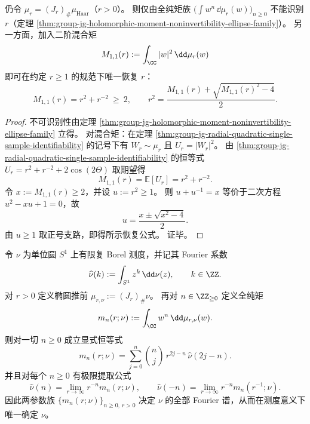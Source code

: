 \begin{proposition}\label{prop:group-jg-minimal-radial-identifiability-threshold}
仍令 \(\mu_r=(J_r)_\#\mu_{\mathrm{Haar}}\)（\(r>0\)）。
则仅由全纯矩族 \(\bigl(\int w^n\,\dd\mu_r(w)\bigr)_{n\ge 0}\) 不能识别 \(r\)（定理 \ref{thm:group-jg-holomorphic-moment-noninvertibility-ellipse-family}）。
另一方面，加入二阶混合矩
\[
M_{1,1}(r):=\int_{\CC}|w|^2\,\dd\mu_r(w)
\]
即可在约定 \(r\ge 1\) 的规范下唯一恢复 \(r\)：
\[
M_{1,1}(r)=r^2+r^{-2}\ \ge\ 2,
\qquad
r^2=\frac{M_{1,1}(r)+\sqrt{M_{1,1}(r)^2-4}}{2}.
\]
\end{proposition}

\begin{proof}
不可识别性由定理 \ref{thm:group-jg-holomorphic-moment-noninvertibility-ellipse-family} 立得。
对混合矩：在定理 \ref{thm:group-jg-radial-quadratic-single-sample-identifiability} 的记号下有 \(W_r\sim\mu_r\) 且 \(U_r=|W_r|^2\)。
由 \eqref{thm:group-jg-radial-quadratic-single-sample-identifiability} 的恒等式
\(
U_r=r^2+r^{-2}+2\cos(2\Theta)
\)
取期望得
\[
M_{1,1}(r)=\mathbb{E}[U_r]=r^2+r^{-2}.
\]
令 \(x:=M_{1,1}(r)\ge 2\)，并设 \(u:=r^2\ge 1\)。
则 \(u+u^{-1}=x\) 等价于二次方程 \(u^2-xu+1=0\)，故
\[
u=\frac{x\pm\sqrt{x^2-4}}{2}.
\]
由 \(u\ge 1\) 取正号支路，即得所示恢复公式。
证毕。
\end{proof}

\begin{theorem}\label{thm:group-jg-binomial-filtering-fourier-extraction}
令 \(\nu\) 为单位圆 \(S^1\) 上有限复 Borel 测度，并记其 Fourier 系数
\[
\widehat\nu(k):=\int_{S^1} z^k\,\dd\nu(z),\qquad k\in\ZZ.
\]
对 \(r>0\) 定义椭圆推前 \(\mu_{r,\nu}:=(J_r)_\#\nu\)。
再对 \(n\in\ZZ_{\ge 0}\) 定义全纯矩
\[
m_n(r;\nu):=\int_{\CC} w^n\,\dd\mu_{r,\nu}(w).
\]
则对一切 \(n\ge 0\) 成立显式恒等式
\begin{equation}\label{eq:group-jg-binomial-filtering}
m_n(r;\nu)=\sum_{j=0}^{n}\binom{n}{j}\,r^{2j-n}\,\widehat\nu(2j-n).
\end{equation}
并且对每个 \(n\ge 0\) 有极限提取公式
\[
\widehat\nu(n)=\lim_{r\to\infty} r^{-n}m_n(r;\nu),
\qquad
\widehat\nu(-n)=\lim_{r\to\infty} r^{-n}m_n(r^{-1};\nu).
\]
因此两参数族 \(\{m_n(r;\nu)\}_{n\ge 0,\ r>0}\) 决定 \(\nu\) 的全部 Fourier 谱，从而在测度意义下唯一确定 \(\nu\)。
\end{theorem}

